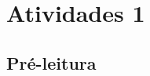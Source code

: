 \documentclass[12pt]{extarticle}
\begin{document}
\tableofcontents




\section{Atividades 1}


\subsection{Pré-leitura}






\end{document}
